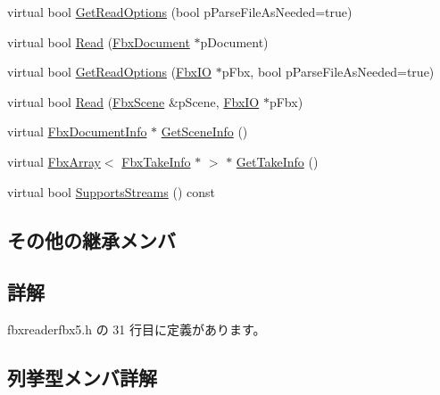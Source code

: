 \begin{DoxyCompactItemize}
\item 
virtual bool \hyperlink{class_fbx_reader_fbx5_a30c6a2a6f02fddffecec9cabf9f51ed7}{Get\+Read\+Options} (bool p\+Parse\+File\+As\+Needed=true)
\item 
virtual bool \hyperlink{class_fbx_reader_fbx5_aac75f44d42d473ac88a54c81ec5b1af6}{Read} (\hyperlink{class_fbx_document}{Fbx\+Document} $\ast$p\+Document)
\item 
virtual bool \hyperlink{class_fbx_reader_fbx5_a6c8620d040add56c30500a593b4e56d6}{Get\+Read\+Options} (\hyperlink{class_fbx_i_o}{Fbx\+IO} $\ast$p\+Fbx, bool p\+Parse\+File\+As\+Needed=true)
\item 
virtual bool \hyperlink{class_fbx_reader_fbx5_a9f5142bf143ff9192bb7d687c831ad21}{Read} (\hyperlink{class_fbx_scene}{Fbx\+Scene} \&p\+Scene, \hyperlink{class_fbx_i_o}{Fbx\+IO} $\ast$p\+Fbx)
\item 
virtual \hyperlink{class_fbx_document_info}{Fbx\+Document\+Info} $\ast$ \hyperlink{class_fbx_reader_fbx5_af685112183765e2a278bbbc898374074}{Get\+Scene\+Info} ()
\item 
virtual \hyperlink{class_fbx_array}{Fbx\+Array}$<$ \hyperlink{class_fbx_take_info}{Fbx\+Take\+Info} $\ast$ $>$ $\ast$ \hyperlink{class_fbx_reader_fbx5_a4680a5c4695d3692582d3ca8db71cd01}{Get\+Take\+Info} ()
\item 
virtual bool \hyperlink{class_fbx_reader_fbx5_ae6f619a41303077d9d4ed2935f3d2108}{Supports\+Streams} () const
\end{DoxyCompactItemize}
\subsection*{その他の継承メンバ}


\subsection{詳解}


 fbxreaderfbx5.\+h の 31 行目に定義があります。



\subsection{列挙型メンバ詳解}
\mbox{\label{class_fbx_reader_fbx5_a9d205ec64b33007dd74af093943b50c5}} 

